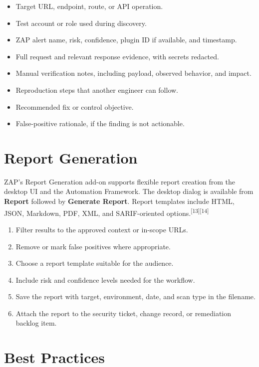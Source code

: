 \documentclass[11pt]{article}
\newcommand{\term}[1]{\textbf{#1}}
\newcommand{\source}[1]{\textsuperscript{[#1]}}
\begin{document}
\begin{itemize}
  \item Target URL, endpoint, route, or API operation.
  \item Test account or role used during discovery.
  \item ZAP alert name, risk, confidence, plugin ID if available, and timestamp.
  \item Full request and relevant response evidence, with secrets redacted.
  \item Manual verification notes, including payload, observed behavior, and impact.
  \item Reproduction steps that another engineer can follow.
  \item Recommended fix or control objective.
  \item False-positive rationale, if the finding is not actionable.
\end{itemize}

\section{Report Generation}

ZAP's Report Generation add-on supports flexible report creation from the desktop UI and the Automation Framework. The desktop dialog is available from \term{Report} followed by \term{Generate Report}. Report templates include HTML, JSON, Markdown, PDF, XML, and SARIF-oriented options.\source{13}\source{14}

\begin{enumerate}
  \item Filter results to the approved context or in-scope URLs.
  \item Remove or mark false positives where appropriate.
  \item Choose a report template suitable for the audience.
  \item Include risk and confidence levels needed for the workflow.
  \item Save the report with target, environment, date, and scan type in the filename.
  \item Attach the report to the security ticket, change record, or remediation backlog item.
\end{enumerate}

\section{Best Practices}
\end{document}
